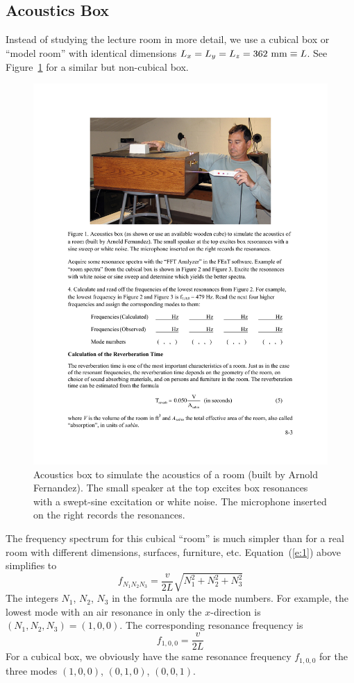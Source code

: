 \documentclass[11pt]{NSF}
\def\be{\begin{equation}}
\def\ee{\end{equation}}
\begin{document}
\subsection{Acoustics Box}

Instead of studying the lecture room in more detail, we use a cubical
box or ``model room” with identical dimensions 
$L_x =L_y = L_z = 362~{\rm mm}\equiv L$.
See Figure~\ref{f:1} for a similar but non-cubical box. 
%
\begin{figure}[hbtp]
\begin{center}
\includegraphics[width=.7\textwidth]{fig8_1}
\caption{Acoustics box to
simulate the acoustics of a room (built by Arnold Fernandez).  The
small speaker at the top excites box resonances with a swept-sine 
excitation or white noise. 
The microphone inserted on the right records the resonances.}
\label{f:1}
\end{center}
\end{figure}
%
The frequency spectrum for this cubical ``room” is much simpler than
for a real room with different dimensions, surfaces, furniture, etc.
Equation~(\ref{e:1}) above simplifies to
%
\be
f_{N_1N_2N_3} = \frac{v}{2L}\sqrt{N_1^2 + N_2^2 + N_3^2}
\label{e:3}
\ee
%
The integers $N_1$, $N_2$, $N_3$ in the formula are the mode numbers. 
For example, the lowest mode with an air resonance in only the 
$x$-direction is $(N_1, N_2, N_3) = (1, 0, 0)$. 
The corresponding resonance frequency is
%
\be
f_{1,0,0} = \frac{v}{2L}
\ee
%
For a cubical box, we obviously have the same resonance frequency 
$f_{1,0,0}$ for the three modes $(1,0,0)$, $(0,1,0)$, $(0,0,1)$.
\end{document}
